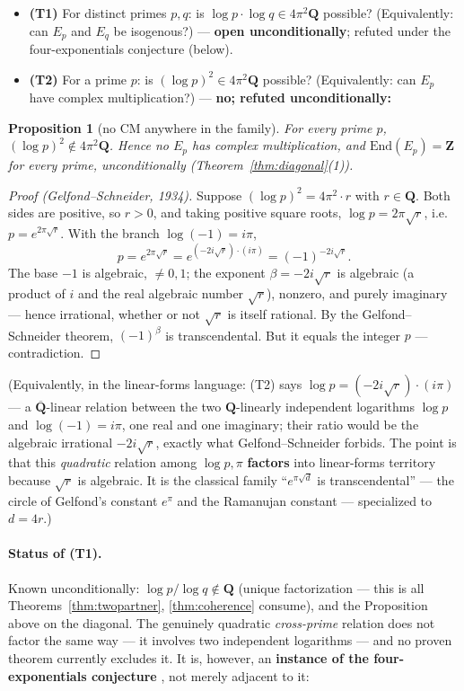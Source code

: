 \documentclass[11pt]{article}
\newtheorem*{proposition}{Proposition}
\theoremstyle{definition}
\theoremstyle{remark}
\newcommand{\Z}{\mathbf{Z}}
\newcommand{\Q}{\mathbf{Q}}
\newcommand{\End}{\mathrm{End}}
\begin{document}
\begin{itemize}
\item \textbf{(T1)} For distinct primes $p, q$: is
$\log p \cdot \log q \in 4\pi^2\Q$ possible? (Equivalently: can $E_p$ and
$E_q$ be isogenous?) --- \textbf{open unconditionally}; refuted under the
four-exponentials conjecture (below).
\item \textbf{(T2)} For a prime $p$: is $(\log p)^2 \in 4\pi^2\Q$ possible?
(Equivalently: can $E_p$ have complex multiplication?) --- \textbf{no;
refuted unconditionally:}
\end{itemize}

\begin{proposition}[no CM anywhere in the family]
For every prime $p$, $(\log p)^2 \notin 4\pi^2\Q$. Hence no $E_p$ has
complex multiplication, and $\End(E_p) = \Z$ for every prime,
unconditionally (Theorem~\ref{thm:diagonal}(1)).
\end{proposition}

\begin{proof}[Proof (Gelfond--Schneider, 1934)]
Suppose $(\log p)^2 = 4\pi^2\cdot r$ with $r \in \Q$. Both sides are
positive, so $r > 0$, and taking positive square roots,
$\log p = 2\pi\sqrt{r}$, i.e.\ $p = e^{2\pi\sqrt{r}}$. With the branch
$\log(-1) = i\pi$,
\[
p = e^{2\pi\sqrt{r}} = e^{(-2i\sqrt{r})\cdot(i\pi)} = (-1)^{-2i\sqrt{r}} .
\]
The base $-1$ is algebraic, $\neq 0, 1$; the exponent
$\beta = -2i\sqrt{r}$ is algebraic (a product of $i$ and the real algebraic
number $\sqrt{r}$), nonzero, and purely imaginary --- hence irrational,
whether or not $\sqrt{r}$ is itself rational. By the Gelfond--Schneider
theorem, $(-1)^\beta$ is transcendental. But it equals the integer $p$ ---
contradiction.
\end{proof}

(Equivalently, in the linear-forms language: (T2) says
$\log p = (-2i\sqrt{r})\cdot(i\pi)$ --- a $\overline{\Q}$-linear relation
between the two $\Q$-linearly independent logarithms $\log p$ and
$\log(-1) = i\pi$, one real and one imaginary; their ratio would be the
algebraic irrational $-2i\sqrt{r}$, exactly what Gelfond--Schneider forbids.
The point is that this \emph{quadratic} relation among $\log p, \pi$
\textbf{factors} into linear-forms territory because $\sqrt{r}$ is
algebraic. It is the classical family ``$e^{\pi\sqrt{d}}$ is
transcendental'' --- the circle of Gelfond's constant $e^\pi$ and the
Ramanujan constant --- specialized to $d = 4r$.)

\paragraph{Status of (T1).}
Known unconditionally: $\log p/\log q \notin \Q$ (unique factorization ---
this is all Theorems~\ref{thm:twopartner}, \ref{thm:coherence} consume), and
the Proposition above on the diagonal. The genuinely quadratic
\emph{cross-prime} relation does not factor the same way --- it involves two
independent logarithms --- and no proven theorem currently excludes it. It
is, however, an \textbf{instance of the four-exponentials conjecture}
\cite{FourExp}, not merely adjacent to it:
\end{document}
